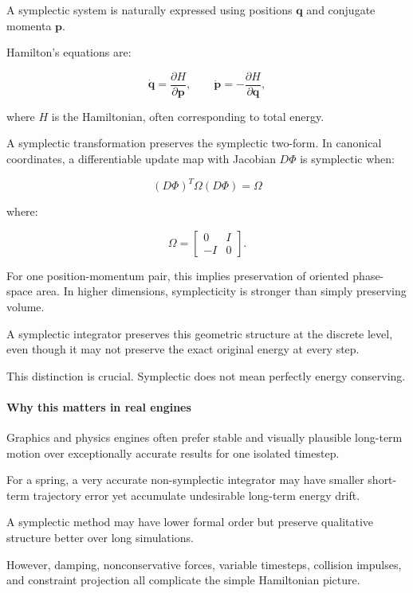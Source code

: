 A symplectic system is naturally expressed using positions \(\mathbf q\) and conjugate momenta \(\mathbf p\).

Hamilton's equations are:

\[
\dot{\mathbf q}=\frac{\partial H}{\partial\mathbf p}, \qquad \dot{\mathbf p}=-\frac{\partial H}{\partial\mathbf q},
\]

where \(H\) is the Hamiltonian, often corresponding to total energy.

A symplectic transformation preserves the symplectic two-form. In canonical coordinates, a differentiable update map with Jacobian \(D\Phi\) is symplectic when:

\[
\boxed{ (D\Phi)^T\Omega(D\Phi)=\Omega }
\]

where:

\[
\Omega= \begin{bmatrix} 0&I\\ -I&0 \end{bmatrix}.
\]

For one position-momentum pair, this implies preservation of oriented phase-space area. In higher dimensions, symplecticity is stronger than simply preserving volume.

A symplectic integrator preserves this geometric structure at the discrete level, even though it may not preserve the exact original energy at every step.

This distinction is crucial. Symplectic does not mean perfectly energy conserving.

\paragraph{Why this matters in real engines}\label{02-foundations-ii-ch025-why-this-matters-in-real-engines}

Graphics and physics engines often prefer stable and visually plausible long-term motion over exceptionally accurate results for one isolated timestep.

For a spring, a very accurate non-symplectic integrator may have smaller short-term trajectory error yet accumulate undesirable long-term energy drift.

A symplectic method may have lower formal order but preserve qualitative structure better over long simulations.

However, damping, nonconservative forces, variable timesteps, collision impulses, and constraint projection all complicate the simple Hamiltonian picture.

